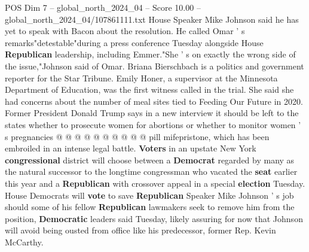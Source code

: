 \begin{textsample}{POS Dim 7 – global\_north\_2024\_04 – Score 10.00 – global\_north\_2024\_04/107861111.txt}
House Speaker Mike Johnson said he has yet to speak with Bacon about the resolution.
He called Omar ' s remarks"detestable"during a press conference Tuesday alongside House \textbf{Republican} leadership, including Emmer."She ' s on exactly the wrong side of the issue,"Johnson said of Omar.
Briana Bierschbach is a politics and government reporter for the Star Tribune.
Emily Honer, a supervisor at the Minnesota Department of Education, was the first witness called in the trial.
She said she had concerns about the number of meal sites tied to Feeding Our Future in 2020.
Former President Donald Trump says in a new interview it should be left to the states whether to prosecute women for abortions or whether to monitor women ' s pregnancies @ @ @ @ @ @ @ @ @ @ pill mifepristone, which has been embroiled in an intense legal battle. \textbf{Voters} in an upstate New York \textbf{congressional} district will choose between a \textbf{Democrat} regarded by many as the natural successor to the longtime congressman who vacated the \textbf{seat} earlier this year and a \textbf{Republican} with crossover appeal in a special \textbf{election} Tuesday.
House Democrats will \textbf{vote} to save \textbf{Republican} Speaker Mike Johnson ' s job should some of his fellow \textbf{Republican} lawmakers seek to remove him from the position, \textbf{Democratic} leaders said Tuesday, likely assuring for now that Johnson will avoid being ousted from office like his predecessor, former Rep.
Kevin McCarthy.

\end{textsample}
